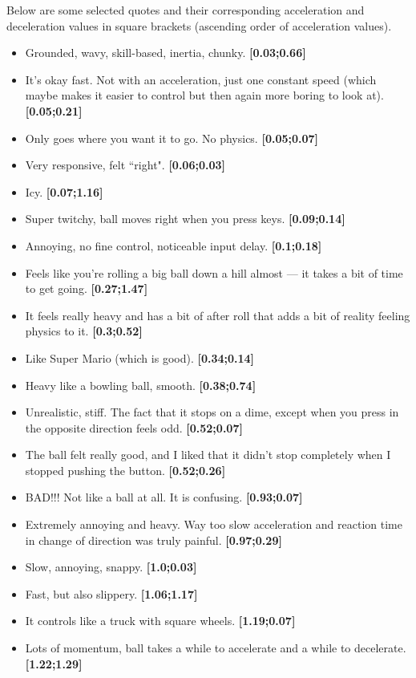 Below are some selected quotes and their corresponding acceleration and deceleration values in square brackets (ascending order of acceleration values).
\begin{itemize}[noitemsep,nolistsep]
\item Grounded, wavy, skill-based, inertia, chunky. \textbf{[0.03;0.66]}
\item It's okay fast. Not with an acceleration, just one constant speed (which maybe makes it easier to control but then again more boring to look at). \textbf{[0.05;0.21]}
\item Only goes where you want it to go. No physics. \textbf{[0.05;0.07]}
\item Very responsive, felt ``right". \textbf{[0.06;0.03]}
\item Icy. \textbf{[0.07;1.16]}
\item Super twitchy, ball moves right when you press keys. \textbf{[0.09;0.14]}
\item Annoying, no fine control, noticeable input delay. \textbf{[0.1;0.18]}
\item Feels like you're rolling a big ball down a hill almost --- it takes a bit of time to get going. \textbf{[0.27;1.47]}
\item It feels really heavy and has a bit of after roll that adds a bit of reality feeling physics to it. \textbf{[0.3;0.52]}
\item Like Super Mario (which is good). \textbf{[0.34;0.14]}
\item Heavy like a bowling ball, smooth. \textbf{[0.38;0.74]}
\item Unrealistic, stiff. The fact that it stops on a dime, except when you press in the opposite direction feels odd. \textbf{[0.52;0.07]}
\item The ball felt really good, and I liked that it didn't stop completely when I stopped pushing the button. \textbf{[0.52;0.26]}
\item BAD!!! Not like a ball at all. It is confusing. \textbf{[0.93;0.07]}
\item Extremely annoying and heavy. Way too slow acceleration and reaction time in change of direction was truly painful. \textbf{[0.97;0.29]}
\item Slow, annoying, snappy. \textbf{[1.0;0.03]}
\item Fast, but also slippery. \textbf{[1.06;1.17]}
\item It controls like a truck with square wheels. \textbf{[1.19;0.07]}
\item Lots of momentum, ball takes a while to accelerate and a while to decelerate. \textbf{[1.22;1.29]}

\end{itemize}
